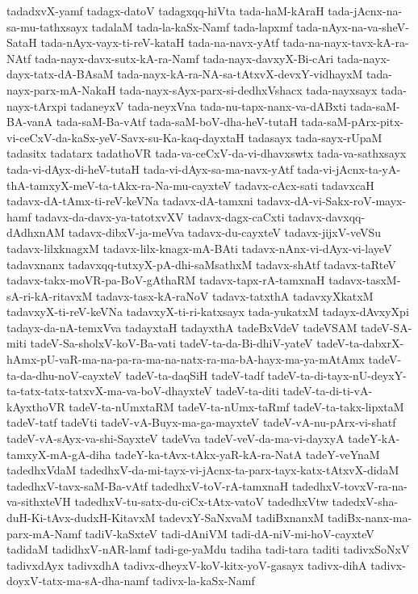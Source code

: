 {tadadxvX-yamf
tadagx-datoV
tadagxqq-hiVta
tada-haM-kAraH
tada-jAcnx-na-sa-mu-tathxsayx
tadalaM
tada-la-kaSx-Namf
tada-lapxmf
tada-nAyx-na-va-sheV-SataH
tada-nAyx-vayx-ti-reV-kataH
tada-na-navx-yAtf
tada-na-nayx-tavx-kA-ra-NAtf
tada-nayx-davx-sutx-kA-ra-Namf
tada-nayx-davxyX-Bi-cAri
tada-nayx-dayx-tatx-dA-BAsaM
tada-nayx-kA-ra-NA-sa-tAtxvX-devxY-vidhayxM
tada-nayx-parx-mA-NakaH
tada-nayx-sAyx-parx-si-dedhxVshacx
tada-nayxsayx
tada-nayx-tArxpi
tadaneyxV
tada-neyxVna
tada-nu-tapx-nanx-va-dABxti
tada-saM-BA-vanA
tada-saM-Ba-vAtf
tada-saM-boV-dha-heV-tutaH
tada-saM-pArx-pitx-vi-ceCxV-da-kaSx-yeV-Savx-su-Ka-kaq-dayxtaH
tadasayx
tada-sayx-rUpaM
tadasitx
tadatarx
tadathoVR
tada-va-ceCxV-da-vi-dhavxswtx
tada-va-sathxsayx
tada-vi-dAyx-di-heV-tutaH
tada-vi-dAyx-sa-ma-navx-yAtf
tada-vi-jAcnx-ta-yA-thA-tamxyX-meV-ta-tAkx-ra-Na-mu-cayxteV
tadavx-cAcx-sati
tadavxcaH
tadavx-dA-tAmx-ti-reV-keVNa
tadavx-dA-tamxni
tadavx-dA-vi-Sakx-roV-mayx-hamf
tadavx-da-davx-ya-tatotxvXV
tadavx-dagx-caCxti
tadavx-davxqq-dAdhxnAM
tadavx-dibxV-ja-meVva
tadavx-du-cayxteV
tadavx-jijxV-veVSu
tadavx-lilxknagxM
tadavx-lilx-knagx-mA-BAti
tadavx-nAnx-vi-dAyx-vi-layeV
tadavxnanx
tadavxqq-tutxyX-pA-dhi-saMsathxM
tadavx-shAtf
tadavx-taRteV
tadavx-takx-moVR-pa-BoV-gAthaRM
tadavx-tapx-rA-tamxnaH
tadavx-tasxM-sA-ri-kA-ritavxM
tadavx-tasx-kA-raNoV
tadavx-tatxthA
tadavxyXkatxM
tadavxyX-ti-reV-keVNa
tadavxyX-ti-ri-katxsayx
tada-yukatxM
tadayx-dAvxyXpi
tadayx-da-nA-temxVva
tadayxtaH
tadayxthA
tadeBxVdeV
tadeVSAM
tadeV-SA-miti
tadeV-Sa-sholxV-koV-Ba-vati
tadeV-ta-da-Bi-dhiV-yateV
tadeV-ta-dabxrX-hAmx-pU-vaR-ma-na-pa-ra-ma-na-natx-ra-ma-bA-hayx-ma-ya-mAtAmx
tadeV-ta-da-dhu-noV-cayxteV
tadeV-ta-daqSiH
tadeV-tadf
tadeV-ta-di-tayx-nU-deyxY-ta-tatx-tatx-tatxvX-ma-va-boV-dhayxteV
tadeV-ta-diti
tadeV-ta-di-ti-vA-kAyxthoVR
tadeV-ta-nUmxtaRM
tadeV-ta-nUmx-taRmf
tadeV-ta-takx-lipxtaM
tadeV-tatf
tadeVti
tadeV-vA-Buyx-ma-ga-mayxteV
tadeV-vA-nu-pArx-vi-shatf
tadeV-vA-sAyx-va-shi-SayxteV
tadeVva
tadeV-veV-da-ma-vi-dayxyA
tadeY-kA-tamxyX-mA-gA-diha
tadeY-ka-tAvx-tAkx-yaR-kA-ra-NatA
tadeY-veYnaM
tadedhxVdaM
tadedhxV-da-mi-tayx-vi-jAcnx-ta-parx-tayx-katx-tAtxvX-didaM
tadedhxV-tavx-saM-Ba-vAtf
tadedhxV-toV-rA-tamxnaH
tadedhxV-tovxV-ra-na-va-sithxteVH
tadedhxV-tu-satx-du-ciCx-tAtx-vatoV
tadedhxVtw
tadedxV-sha-duH-Ki-tAvx-dudxH-KitavxM
tadevxY-SaNxvaM
tadiBxnanxM
tadiBx-nanx-ma-parx-mA-Namf
tadiV-kaSxteV
tadi-dAniVM
tadi-dA-niV-mi-hoV-cayxteV
tadidaM
tadidhxV-nAR-lamf
tadi-ge-yaMdu
tadiha
tadi-tara
taditi
tadivxSoNxV
tadivxdAyx
tadivxdhA
tadivx-dheyxV-koV-kitx-yoV-gasayx
tadivx-dihA
tadivx-doyxV-tatx-ma-sA-dha-namf
tadivx-la-kaSx-Namf
}
